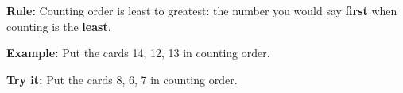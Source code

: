 \documentclass[12pt]{article}
\begin{document}

\begin{formulabox}
\textbf{Rule:} Counting order is least to greatest: the number you would say
\textbf{first} when counting is the \textbf{least}.
\end{formulabox}

\begin{examplebox}
\textbf{Example:} \quad Put the cards 14, 12, 13 in counting order.
\end{examplebox}

\begin{tryitbox}
\textbf{Try it:} \quad Put the cards 8, 6, 7 in counting order.\\[2pt]
\end{tryitbox}
\end{document}
